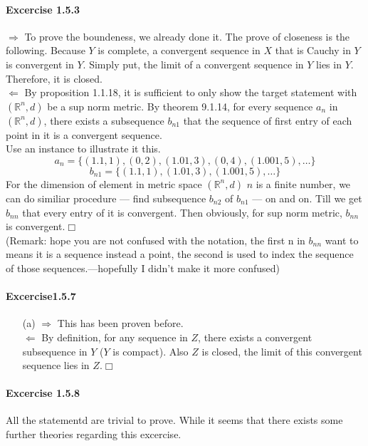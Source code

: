 \paragraph{Excercise 1.5.3}$\Rightarrow$ To prove the boundeness, we already done it. The prove of closeness is the following. Because $Y$ is complete, a convergent sequence in $X$ that is Cauchy in $Y$ is convergent in $Y$. Simply put, the limit of a convergent sequence in $Y$ lies in $Y$. Therefore, it is closed.\\
$\Leftarrow$ By proposition 1.1.18, it is sufficient to only show the target statement with $(\mathbb{R}^n,d)$ be a sup norm metric. By theorem 9.1.14, for every sequence $a_{n}$ in $(\mathbb{R}^n,d)$, there exists a subsequence $b_{n1}$ that the sequence of first entry of each point in it is a convergent sequence.\\Use an instance to illustrate it this.\\
\[a_{n}=\{(1.1,1),(0,2),(1.01,3),(0,4),(1.001,5),\dots\} 
\]
\[b_{n1}=\{(1.1,1),(1.01,3),(1.001,5),\dots\}
\]
For the dimension of element in metric space $(\mathbb{R}^n,d)$ $n$ is a finite number, we can do similiar procedure --- find subsequence $b_{n2}$ of $b_{n1}$ --- on and on. Till we get $b_{nn}$ that every entry of it is convergent. Then obviously, for sup norm metric, $b_{nn}$ is convergent.$\Box$\\(Remark: hope you are not confused with the notation, the first n in $b_{nn}$ want to means it is a sequence instead a point, the second is used to index the sequence of those  sequences.---hopefully I didn't make it more confused)
\paragraph{Excercise1.5.7}
\begin{itemize}
\item[(a)]$\Rightarrow$ This has been proven before.\\
$\Leftarrow$ By definition, for any sequence in $Z$, there exists a convergent subsequence in $Y$ ($Y$ is compact). Also $Z$ is closed, the limit of this convergent sequence lies in $Z$.$\Box$
\end{itemize}

\paragraph{Excercise 1.5.8} All the statementd are trivial to prove. While it seems that there exists some further theories regarding this excercise.

